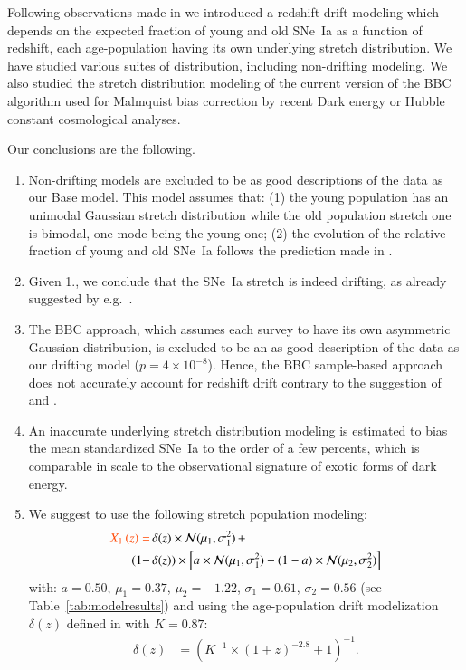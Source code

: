 \documentclass[]{aa} %
\newcommand{\nn}[1]{{\textcolor[rgb]{1, 0.27, 0}{#1}}}
\begin{document}
Following observations made in \cite{rigault2018} we introduced a redshift drift
modeling \nn{which} depends on the expected fraction of young and old SNe~Ia as a
function of redshift, each age-population having its own underlying stretch
distribution. We have studied various suites of distribution\nn{, including} non-drifting
modeling. We also studied the stretch distribution modeling \nn{of the}
current version of the BBC algorithm used for Malmquist bias correction by 
recent Dark energy or Hubble constant cosmological analyses. 

Our conclusions are the following.
\begin{enumerate}

    \item Non-drifting models are excluded to be as good descriptions of the
        data \nn{as} our Base model. This model assumes that: (1) the young
        population has an unimodal Gaussian stretch distribution while the old
        population stretch one is bimodal, one mode being the young one; (2) the
        evolution of the relative fraction of young and old SNe~Ia follows the
        prediction made in \cite{rigault2018}. 

    \item Given 1., we conclude that the SNe~Ia \nn{stretch} is indeed drifting, as
        already suggested by e.g.~\cite{howell2007}. 

    \item The BBC approach, which assumes each survey to have its own asymmetric
        Gaussian distribution, is excluded to be an as good description of the
        data as our drifting model ($p=4\times10^{-8}$). Hence, the BBC
        sample-based approach does not accurately account for redshift drift \nn{contrary
        to the suggestion of} \cite{scolnic2016} and \cite{scolnic2018a}.

    \item An inaccurate underlying stretch distribution modeling is estimated to
        bias the mean standardized SNe~Ia \nn{to} the order of a few percents, which
        is comparable in scale to the observational signature of exotic forms of
        dark energy.

    \item We suggest to use the following stretch population modeling:
        \begin{align}
            \label{eqconclusion:stretchz}
            \nn{X_1\left(z \right) =
            } &\,\delta(z)\times\mathcal{N}(\mu_1,\sigma_1^2)\,+\nonumber\\
            (1-&\,\delta(z)) \times  \left[a\times\mathcal{N}(\mu_1,\sigma_1^2) +
            (1-a)\times\mathcal{N}(\mu_2,\sigma_2^2)\right]
        \end{align}
    with: $a=0.50$, $\mu_1=0.37$, $\mu_2=-1.22$, $\sigma_1=0.61$,
    $\sigma_2=0.56$ (see Table~\ref{tab:modelresults}) and using the
    age-population drift modelization $\delta(z)$ defined in \cite{rigault2018}
    with $K=0.87$:
    \begin{align}
        \delta(z) & = \left( K^{-1} \times (1+z)^{-2.8} +1 \right)^{-1}.
    \end{align}
\end{enumerate}
\end{document}

